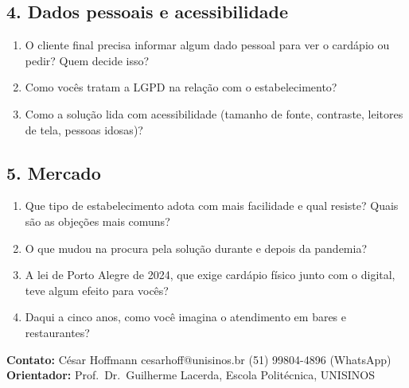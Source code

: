 \documentclass[11pt,a4paper]{article}
\newcommand{\tema}[1]{\subsection*{\normalsize #1}}
\begin{document}
\tema{4. Dados pessoais e acessibilidade}
\begin{enumerate}[resume]
  \item O cliente final precisa informar algum dado pessoal para ver o cardápio ou pedir? Quem decide isso?
  \item Como vocês tratam a LGPD na relação com o estabelecimento?
  \item Como a solução lida com acessibilidade (tamanho de fonte, contraste, leitores de tela, pessoas idosas)?
\end{enumerate}

\tema{5. Mercado}
\begin{enumerate}[resume]
  \item Que tipo de estabelecimento adota com mais facilidade e qual resiste? Quais são as objeções mais comuns?
  \item O que mudou na procura pela solução durante e depois da pandemia?
  \item A lei de Porto Alegre de 2024, que exige cardápio físico junto com o digital, teve algum efeito para vocês?
  \item Daqui a cinco anos, como você imagina o atendimento em bares e restaurantes?
\end{enumerate}

\vspace{0.6em}
\textbf{Contato:} César Hoffmann \textbullet{} cesarhoff@unisinos.br \textbullet{} (51) 99804-4896 (WhatsApp)\\
\textbf{Orientador:} Prof.\ Dr.\ Guilherme Lacerda, Escola Politécnica, UNISINOS
\end{document}
